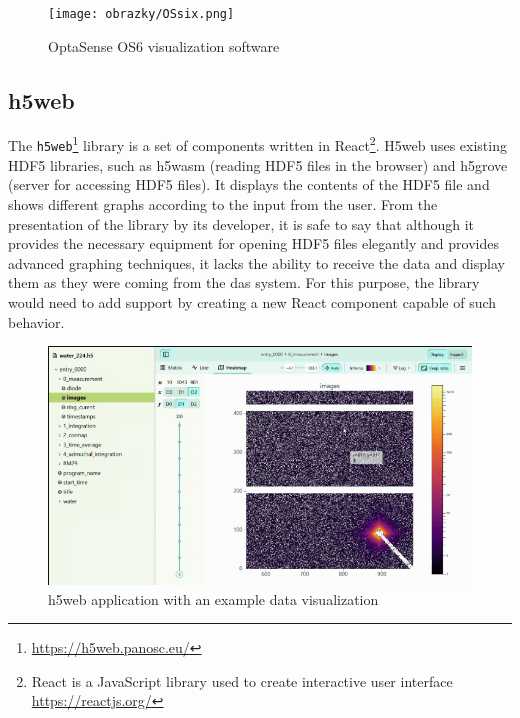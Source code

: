 \begin{figure}[t]
    \centering
    \texttt{[image: obrazky/OSsix.png]}
    \caption{OptaSense OS6 visualization software \cite{ytossix}}
    \label{fig:ossix}
\end{figure}


\subsection{h5web}\label{txt.design.h5web}

The \verb|h5web|\footnote{\url{https://h5web.panosc.eu/}} library is a set of components written in React\footnote{React is a JavaScript library used to create interactive user interface \url{https://reactjs.org/}}. H5web uses existing HDF5 libraries, such as h5wasm (reading HDF5 files in the browser) and h5grove (server for accessing HDF5 files). It displays the contents of the HDF5 file and shows different graphs according to the input from the user. From the presentation of the library by its developer, it is safe to say that although it provides the necessary equipment for opening HDF5 files elegantly and provides advanced graphing techniques, it lacks the ability to receive the data and display them as they were coming from the \ac{das} system. For this purpose, the library would need to add support by creating a new React component capable of such behavior.

\begin{figure}
    \centering
    \includegraphics[width=\linewidth]{obrazky/h5web.png}
    \caption{h5web application with an example data visualization}
    \label{fig:h5web}
\end{figure}

\newpage